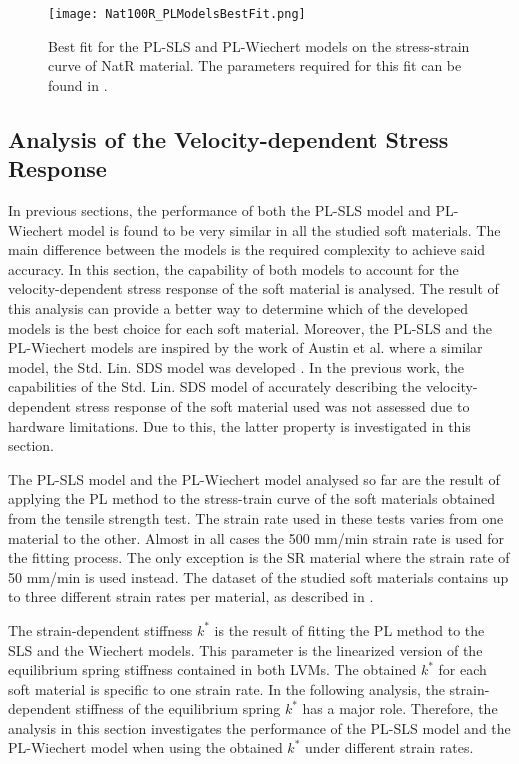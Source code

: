 \begin{figure}[H]
	\centering
	\texttt{[image: Nat100R\_PLModelsBestFit.png]}
	\caption{Best fit for the PL-SLS and PL-Wiechert models on the stress-strain curve of NatR material. The parameters required for this fit can be found in .}
	\label{fig:BestFitNat100R}
\end{figure}


\subsection{Analysis of the Velocity-dependent Stress Response} \label{VelocityAnalysis}

In previous sections, the performance of both the PL-SLS model and PL-Wiechert model is found to be very similar in all the studied soft materials. The main difference between the models is the required complexity to achieve said accuracy. In this section, the capability of both models to account for the velocity-dependent stress response of the soft material is analysed. The result of this analysis can provide a better way to determine which of the developed models is the best choice for each soft material. Moreover, the PL-SLS and the PL-Wiechert models are inspired by the work of Austin et al. where a similar model, the Std. Lin. SDS model was developed \cite{austin2015control}. In the previous work, the capabilities of the Std. Lin. SDS model of accurately describing the velocity-dependent stress response of the soft material used was not assessed due to hardware limitations. Due to this, the latter property is investigated in this section. 

The PL-SLS model and the PL-Wiechert model analysed so far are the result of applying the PL method to the stress-train curve of the soft materials obtained from the tensile strength test. The strain rate used in these tests varies from one material to the other. Almost in all cases the 500 mm/min strain rate is used for the fitting process. The only exception is the SR material where the strain rate of 50 mm/min is used instead. The dataset of the studied soft materials contains up to three different strain rates per material, as described in . 

The strain-dependent stiffness $k^*$ is the result of fitting the PL method to the SLS and the Wiechert models. This parameter is the linearized version of the equilibrium spring stiffness contained in both LVMs. The obtained $k^*$ for each soft material is specific to one strain rate. In the following analysis, the strain-dependent stiffness of the equilibrium spring $k^*$ has a major role. Therefore, the analysis in this section investigates the performance of the PL-SLS model and the PL-Wiechert model when using the obtained $k^*$ under different strain rates.

